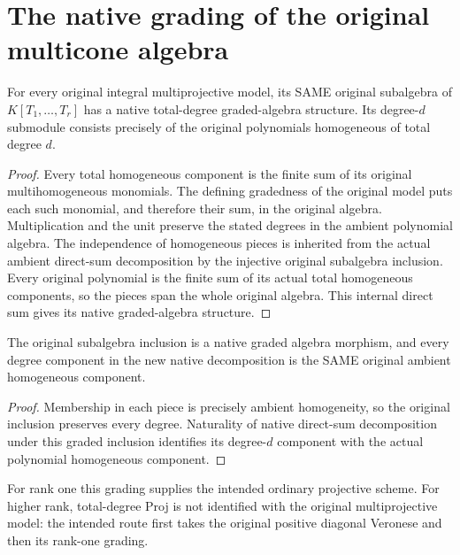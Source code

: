 \section{The native grading of the original multicone algebra}

\begin{lemma}
\label{lem:fc-native-model-total-grading}
\leanok
{}
For every original integral multiprojective model, its SAME original
subalgebra of $K[T_1,\ldots,T_r]$ has a native total-degree graded-algebra
structure. Its degree-$d$ submodule consists precisely of the original
polynomials homogeneous of total degree $d$.
\end{lemma}
\begin{proof}
Every total homogeneous component is the finite sum of its original
multihomogeneous monomials. The defining gradedness of the original model
puts each such monomial, and therefore their sum, in the original algebra.
Multiplication and the unit preserve the stated degrees in the ambient
polynomial algebra. The independence of homogeneous pieces is inherited
from the actual ambient direct-sum decomposition by the injective original
subalgebra inclusion. Every original polynomial is the finite sum of its
actual total homogeneous components, so the pieces span the whole
original algebra. This internal direct sum gives its native graded-algebra
structure.
\end{proof}

\begin{lemma}
\label{lem:fc-native-model-total-components}
\leanok
{}
The original subalgebra inclusion is a native graded algebra morphism,
and every degree component in the new native decomposition is the SAME
original ambient homogeneous component.
\end{lemma}
\begin{proof}
Membership in each piece is precisely ambient homogeneity, so the
original inclusion preserves every degree. Naturality of native direct-sum
decomposition under this graded inclusion identifies its degree-$d$
component with the actual polynomial homogeneous component.
\end{proof}

For rank one this grading supplies the intended ordinary projective
scheme. For higher rank, total-degree Proj is not identified with the
original multiprojective model: the intended route first takes the
original positive diagonal Veronese and then its rank-one grading.
